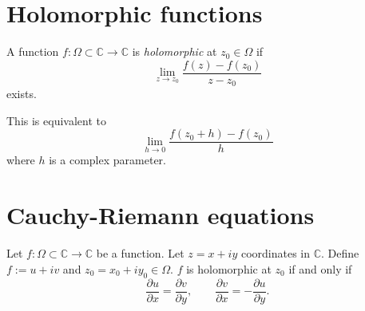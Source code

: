 \section{Holomorphic functions}
\label{section-holomorphic-functions}

\begin{definition}
\label{definition-holomorphic-function}
A function $f:\Omega\subset \mathbb{C} \to
\mathbb{C}$
is {\it holomorphic} at $z_0 \in \Omega$ if
$$
\lim_{z\to z_0} \frac{f(z)-f(z_0)}{z-z_0}
$$
exists.
\end{definition}

\noindent
This is equivalent to
\begin{equation}
\label{equation-holom-funct-secon-defin}
\lim_{h\to 0} \frac{f(z_0+h)-f(z_0)}{h}
\end{equation}
where $h$ is a complex parameter.


\section{Cauchy-Riemann equations}
\label{sectioncauchy-riemann-equations}

\begin{theorem}
\label{theorem-cauchy-riemann}
Let $f:\Omega\subset\mathbb{C}\to \mathbb{C}$
be a function. Let $z=x+iy$ coordinates
in $\mathbb{C}$. Define $f:=u+iv$ and
$z_0=x_0+iy_0 \in \Omega$. $f$ is holomorphic
at $z_0$ if and only if
$$
\frac{\partial u}{\partial x}=\frac{\partial
v}{\partial y},\qquad
\frac{\partial v}{\partial x}=-\frac{\partial
u}{\partial y}.
$$
\end{theorem}

